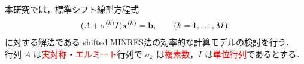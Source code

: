 

本研究では，標準シフト線型方程式
\begin{align}
	(A + \sigma^{(k)}I)\vb{x}^{(k)} = \vb{b}, \qquad (k=1,\dots,M).
	\label{eq-std-sls}
\end{align}
に対する解法である shifted MINRES法\cite{ref-S-HIDAKA-2025}の効率的な計算モデルの検討を行う．\\
行列 $A$ は\textcolor{red}{実対称}・\textcolor{red}{エルミート}行列で $\sigma_{k}$ は\textcolor{red}{複素数}，$I$ は\textcolor{red}{単位行列}であるとする．
